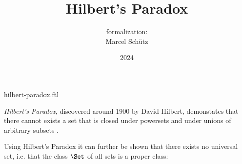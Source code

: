 \documentclass{article}
\title{Hilbert's Paradox}
\author{\Naproche formalization:\\[0.5em]Marcel Schütz}
\date{2024}
\begin{document}
\begin{smodule}{hilbert-paradox.ftl}
  \maketitle
  

  \noindent \emph{Hilbert's Paradox}, discovered around 1900 by David Hilbert, 
  demonstates that there cannot exists a set that is closed under powersets and 
  under unions of arbitrary subsets \cite{PeckhausKahl2002}.


  \noindent Using Hilbert's Paradox it can further be shown that there exists 
  no universal set, i.e. that the class $\Set$ of all sets is a proper class:


  \printbibliography
\end{smodule}
\end{document}
